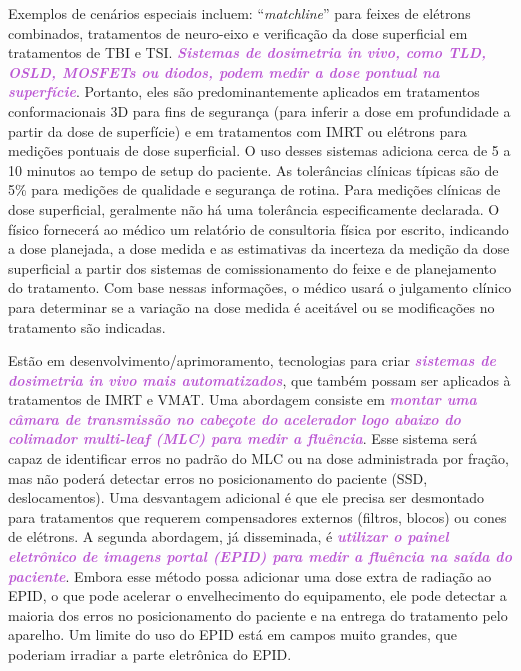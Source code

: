 \documentclass[11pt,a4paper]{article}
\begin{document}
	Exemplos de cenários especiais incluem: ``\textit{matchline}'' para feixes de elétrons combinados, tratamentos de neuro-eixo e verificação da dose superficial em tratamentos de TBI e TSI. \textcolor{MediumOrchid}{\textbf{\textit{Sistemas de dosimetria in vivo, como TLD, OSLD, MOSFETs ou diodos, podem medir a dose pontual na superfície}}}. Portanto, eles são predominantemente aplicados em tratamentos conformacionais 3D para fins de segurança (para inferir a dose em profundidade a partir da dose de superfície) e em tratamentos com IMRT ou elétrons para medições pontuais de dose superficial. O uso desses sistemas adiciona cerca de 5 a 10 minutos ao tempo de setup do paciente. As tolerâncias clínicas típicas são de 5\% para medições de qualidade e segurança de rotina. Para medições clínicas de dose superficial, geralmente não há uma tolerância especificamente declarada. O físico fornecerá ao médico um relatório de consultoria física por escrito, indicando a dose planejada, a dose medida e as estimativas da incerteza da medição da dose superficial a partir dos sistemas de comissionamento do feixe e de planejamento do tratamento. Com base nessas informações, o médico usará o julgamento clínico para determinar se a variação na dose medida é aceitável ou se modificações no tratamento são indicadas.

	Estão em desenvolvimento/aprimoramento, tecnologias para criar \textcolor{MediumOrchid}{\textbf{\textit{sistemas de dosimetria in vivo mais automatizados}}}, que também possam ser aplicados à tratamentos de IMRT e VMAT. Uma abordagem consiste em \textcolor{MediumOrchid}{\textbf{\textit{montar uma câmara de transmissão no cabeçote do acelerador logo abaixo do colimador multi-leaf (MLC) para medir a fluência}}}. Esse sistema será capaz de identificar erros no padrão do MLC ou na dose administrada por fração, mas não poderá detectar erros no posicionamento do paciente (SSD, deslocamentos). Uma desvantagem adicional é que ele precisa ser desmontado para tratamentos que requerem compensadores externos (filtros, blocos) ou cones de elétrons. A segunda abordagem, já disseminada, é \textcolor{MediumOrchid}{\textbf{\textit{utilizar o painel eletrônico de imagens portal (EPID) para medir a fluência na saída do paciente}}}. Embora esse método possa adicionar uma dose extra de radiação ao EPID, o que pode acelerar o envelhecimento do equipamento, ele pode detectar a maioria dos erros no posicionamento do paciente e na entrega do tratamento pelo aparelho. Um limite do uso do EPID está em campos muito grandes, que poderiam irradiar a parte eletrônica do EPID.
\end{document}
